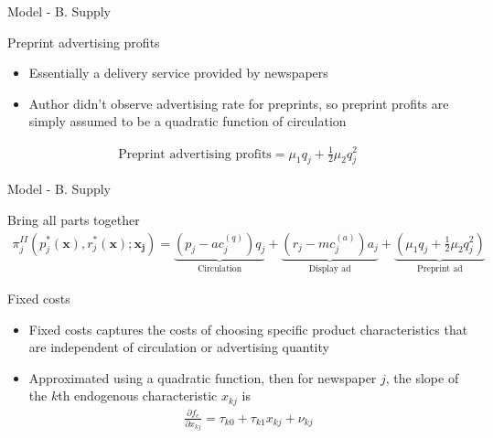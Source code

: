 \documentclass[aspectratio=169]{beamer}
\begin{document}
\begin{frame}{Model - B. Supply}
	
	\begin{block}{Preprint advertising profits}
		\begin{itemize}
			\item Essentially a delivery service provided by newspapers
			\item Author didn't observe advertising rate for preprints, so preprint profits are simply assumed to be a quadratic function of circulation
		\end{itemize}
	\end{block}

	\begin{boxedup}
		\vspace*{-15px}
		\begin{align}
			\text{Preprint advertising profits} = \mu_1 q_j + \frac{1}{2} \mu_2 q_j^2
		\end{align}
	\end{boxedup}


\end{frame}
\begin{frame}{Model - B. Supply}
	
	\setcounter{equation}{13}
	\begin{block}{Bring all parts together}
		\begin{align}
			\pi_{j}^{II}( p_j^*(\boldsymbol{x}), r_j^*(\boldsymbol{x}); \boldsymbol{x_j}) = \underbrace{\left(p_j - ac_j^{(q)} \right) q_j}_{\text{Circulation}} + \underbrace{\left(r_j - mc_j^{(a)} \right) a_j}_{\text{Display ad}} + \underbrace{\left( \mu_1 q_j + \frac{1}{2} \mu_2 q_j^2 \right)}_{\text{Preprint ad}}
		\end{align}
		\vspace*{-20px}
	\end{block}

	\begin{block}{Fixed costs}
		\begin{itemize}
			\item Fixed costs captures the costs of choosing specific product characteristics that are independent of circulation or advertising quantity
			\item Approximated using a quadratic function, then for newspaper $j$, the slope of the $k$th endogenous characteristic $x_{kj}$ is
			\begin{align}
				\frac{\partial f_c}{\partial x_{kj}} = \tau_{k0} + \tau_{k1}x_{kj} + \nu_{kj}
			\end{align}
		\end{itemize}
	\end{block}

\end{frame}
\end{document}
